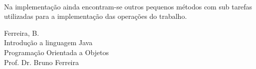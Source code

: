 \documentclass[a4paper,portuguese,12pt]{article}
\begin{document}
\paragraph{} Na implementação ainda encontram-se outros pequenos métodos com sub tarefas utilizadas para a implementação das operações do trabalho.



\begin{thebibliography}{1}	
	
	\bibitem[1]{}Ferreira, B.\\
	Introdução a linguagem Java\\
	Programação Orientada a Objetos\\
	Prof. Dr. Bruno Ferreira		
	
\end{thebibliography}
\end{document}

